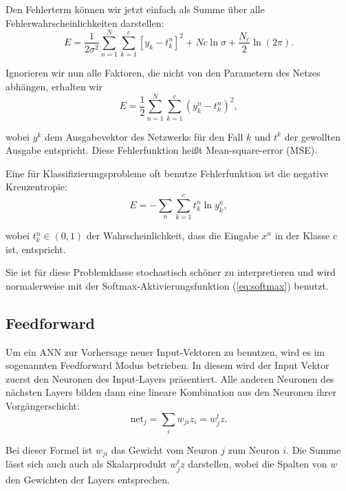 Den Fehlerterm können wir jetzt einfach als Summe über alle Fehlerwahrscheinlichkeiten darstellen:
\begin{equation}
  E = \frac{1}{2 \sigma^2} \sum_{n=1}^{N} \sum_{k=1}^{c} \left[ y_k - t_k^n \right]^2 + Nc \ln \sigma + \frac{N_c}{2} \ln (2 \pi).
\end{equation}

Ignorieren wir nun alle Faktoren, die nicht von den Parametern des Netzes abhängen, erhalten wir 
\begin{equation}
\label{eq:MSE}
E = \frac{1}{2} \sum_{n=1}^N \sum_{k=1}^c \left( y_k^n - t_k^n \right)^2,
\end{equation}

wobei $y^k$ dem Ausgabevektor des Netzwerks für den Fall $k$ und $t^k$ der gewollten Ausgabe entspricht.
Diese Fehlerfunktion heißt Mean-square-error (MSE)\cite{bishop1995neural}.

Eine für Klassifizierungsprobleme oft benutze Fehlerfunktion ist die negative Kreuzentropie:
\begin{equation}
\label{eq:crossEntropy}
    E = -\sum_{n} \sum_{k=1}^c t_k^n \ln y_k^n ,
\end{equation}

wobei $t_k^n \in (0,1)$ der Wahrscheinlichkeit, dass die Eingabe $x^n$ in der Klasse $c$ ist, entspricht. 

Sie ist für diese Problemklasse stochastisch schöner zu interpretieren und wird normalerweise mit der Softmax-Aktivierungsfunktion (\ref{eq:softmax}) benutzt\cite{bishop1995neural}.

\subsection{Feedforward}
Um ein ANN zur Vorhersage neuer Input-Vektoren zu benutzen, wird es im sogenannten Feedforward Modus betrieben. In diesem wird der Input Vektor zuerst den Neuronen des Input-Layers präsentiert. Alle anderen Neuronen des nächsten Layers bilden dann eine lineare Kombination aus den Neuronen ihrer Vorgängerschicht: 
\begin{equation}
\label{eq:feedforward1}
\text{net}_j = \sum_{i} w_{ji} z_i = w_j^t z.
\end{equation}

Bei dieser Formel ist $w_{ji}$ das Gewicht vom Neuron $j$ zum Neuron $i$. Die Summe lässt sich auch auch als Skalarprodukt $w_j^t z$ darstellen, wobei die Spalten von $w$ den Gewichten der Layers entsprechen. %

